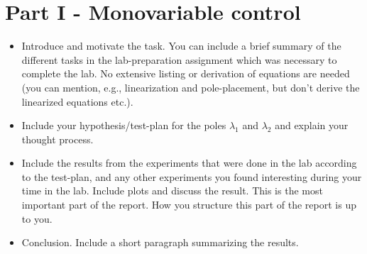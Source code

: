 \section{Part I - Monovariable control}
\begin{itemize}
    \item Introduce and motivate the task. You can include a brief summary of the different tasks in the lab-preparation assignment which was necessary to complete the lab. No extensive listing or derivation of equations are needed (you can mention, e.g., linearization and pole-placement, but don't derive the linearized equations etc.). 
    \item Include your hypothesis/test-plan for the poles $\lambda_{1}$ and $\lambda_{2}$ and explain your thought process.
    \item Include the results from the experiments that were done in the lab according to the test-plan, and any other experiments you found interesting during your time in the lab. Include plots and discuss the result. This is the most important part of the report. How you structure this part of the report is up to you. 
    \item Conclusion. Include a short paragraph summarizing the results. 
\end{itemize}